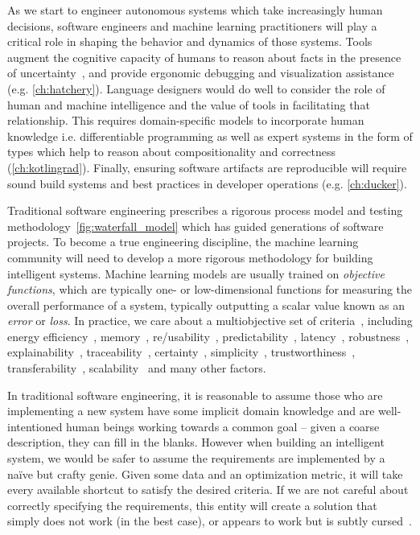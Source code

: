 As we start to engineer autonomous systems which take increasingly human decisions, software engineers and machine learning practitioners will play a critical role in shaping the behavior and dynamics of those systems. Tools augment the cognitive capacity of humans to reason about facts in the presence of uncertainty~\citep{famelis2012partial}, and provide ergonomic debugging and visualization assistance (e.g. \autoref{ch:hatchery}). Language designers would do well to consider the role of human and machine intelligence and the value of tools in facilitating that relationship. This requires domain-specific models to incorporate human knowledge i.e. differentiable programming as well as expert systems in the form of types which help to reason about compositionality and correctness (\autoref{ch:kotlingrad}). Finally, ensuring software artifacts are reproducible will require sound build systems and best practices in developer operations (e.g. \autoref{ch:ducker}).

Traditional software engineering prescribes a rigorous process model and testing methodology~\autoref{fig:waterfall_model} which has guided generations of software projects. To become a true engineering discipline, the machine learning community will need to develop a more rigorous methodology for building intelligent systems. Machine learning models are usually trained on \textit{objective functions}, which are typically one- or low-dimensional functions for measuring the overall performance of a system, typically outputting a scalar value known as an \textit{error} or \textit{loss}. In practice, we care about a multiobjective set of criteria~\citep{censi2015mathematical}, including energy efficiency~\citep{paull2010novel}, memory~\citep{memory2013mitliagkas}, re/usability~\citep{breuleux2017automatic,deleu2019torchmeta}, predictability~\citep{turner2017well}, latency~\citep{ravanelli2018twin}, robustness~\citep{pineau2003policy}, explainability~\citep{turner2016model}, traceability~\citep{guo2017semantically, tsirigotis2018orion}, certainty~\citep{diaz2018interactive}, simplicity~\citep{kastner2019representation}, trustworthiness~\citep{xu2017efficient}, transferability~\citep{mehta2019active}, scalability~\citep{luan2019break} and many other factors.

In traditional software engineering, it is reasonable to assume those who are implementing a new system have some implicit domain knowledge and are well-intentioned human beings working towards a common goal -- given a coarse description, they can fill in the blanks. However when building an intelligent system, we would be safer to assume the requirements are implemented by a na\"ive but crafty genie. Given some data and an optimization metric, it will take every available shortcut to satisfy the desired criteria. If we are not careful about correctly specifying the requirements, this entity will create a solution that simply does not work (in the best case), or appears to work but is subtly cursed~\citep{bellman1957dynamic}.

